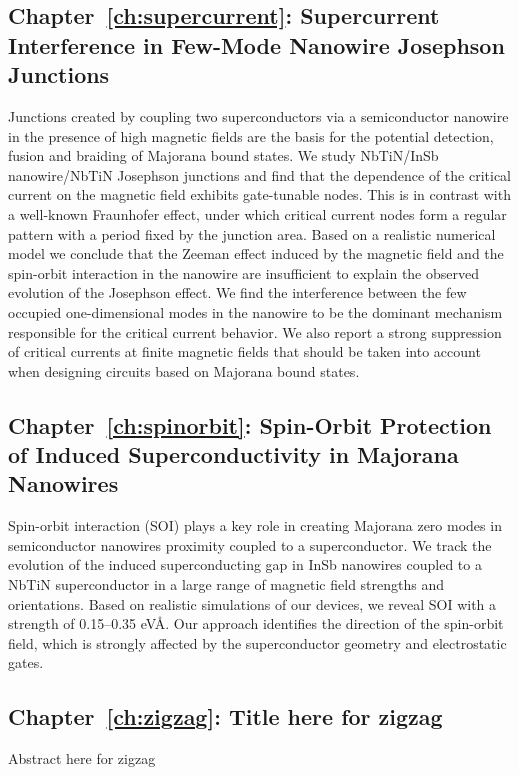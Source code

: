 \subsection{Chapter~\ref{ch:supercurrent}: Supercurrent Interference in Few-Mode Nanowire Josephson Junctions}
Junctions created by coupling two superconductors via a semiconductor nanowire in the presence of high magnetic fields are the basis for the potential detection, fusion and braiding of Majorana bound states.
We study NbTiN/InSb nanowire/NbTiN Josephson junctions and find that the dependence of the critical current on the magnetic field exhibits gate-tunable nodes.
This is in contrast with a well-known Fraunhofer effect, under which critical current nodes form a regular pattern with a period fixed by the junction area.
Based on a realistic numerical model we conclude that the Zeeman effect induced by the magnetic field and the spin-orbit interaction in the nanowire are insufficient to explain the observed evolution of the Josephson effect.
We find the interference between the few occupied one-dimensional modes in the nanowire to be the dominant mechanism responsible for the critical current behavior.
We also report a strong suppression of critical currents at finite magnetic fields that should be taken into account when designing circuits based on Majorana bound states.
\vspace{1mm}

\subsection{Chapter~\ref{ch:spinorbit}: Spin-Orbit Protection of Induced Superconductivity in Majorana Nanowires}
Spin-orbit interaction (SOI) plays a key role in creating Majorana zero modes in semiconductor nanowires proximity coupled to a superconductor.
We track the evolution of the induced superconducting gap in InSb nanowires coupled to a NbTiN superconductor in a large range of magnetic field strengths and orientations.
Based on realistic simulations of our devices, we reveal SOI with a strength of 0.15--0.35 eV\AA.
Our approach identifies the direction of the spin-orbit field, which is strongly affected by the superconductor geometry and electrostatic gates.
\vspace{1mm}

\subsection{Chapter~\ref{ch:zigzag}: Title here for zigzag}
Abstract here for zigzag
\vspace{1mm}

